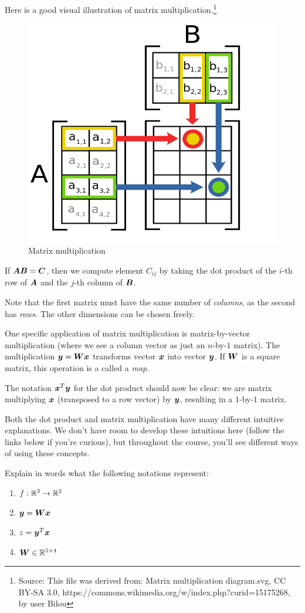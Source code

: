 \documentclass[11pt]{article}
\begin{document}
Here is a good visual illustration of matrix multiplication.\footnote{Source: This file was derived from:  Matrix multiplication diagram.svg, CC BY-SA 3.0, https://commons.wikimedia.org/w/index.php?curid=15175268, by user Bilou}
\begin{figure}[H]
\centering
\includegraphics[width=0.7\linewidth]{matmul}
\caption{Matrix multiplication}
\end{figure}
If ${\bm A}{\bm B} = {\bm C}$, then we compute element $C_{ij}$ by taking the dot product of the $i$-th row of ${\bm A}$ and the $j$-th column of ${\bm B}$.

\noindent Note that the first matrix must have the same number of \emph{columns}, as the second has \emph{rows}. The other dimensions can be chosen freely.

One specific application of matrix multiplication is matrix-by-vector multiplication (where we see a column vector as just an $n$-by-$1$ matrix). The multiplication ${\bm y} = {\bm W}{\bm x}$ transforms vector ${\bm x}$ into vector ${\bm y}$. If ${\bm W}$ is a square matrix, this operation is a called a \emph{map}.

The notation ${\bm x}^T{\bm y}$ for the dot product should now be clear: we are matrix multiplying ${\bm x}$ (transposed to a row vector) by ${\bm y}$, resulting in a $1$-by-$1$ matrix.

Both the dot product and matrix multiplication have many different intuitive explanations. We don't have room to develop these intuitions here (follow the links below if you're curious), but throughout the course, you'll see different ways of using these concepts.

\qu Explain in words what the following notations represent:

\begin{enumerate}
\item $f: {\mathbb R}^3 \to {\mathbb R}^2$ 
\item ${\bm y} = {\bm W} {\bm x}$ 
\item $z = {\bm y}^T{\bm x}$ 
\item ${\bm W} \in {\mathbb R}^{5 \times 4}$ 
\end{enumerate}
\end{document}
